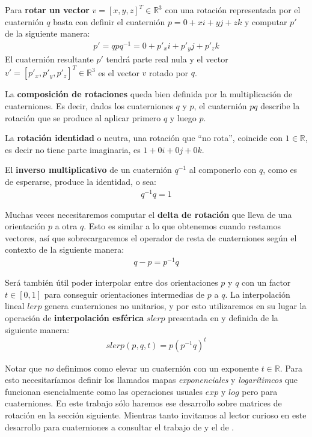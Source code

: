 \documentclass[ twoside,openright,titlepage,numbers=noenddot,%
                headinclude,footinclude,cleardoublepage=empty,abstract=on,
                BCOR=-5mm,paper=a4,fontsize=11pt
                ]{scrreprt}
\newcommand{\R}{\mathbb{R}}
\begin{document}
Para \textbf{rotar un vector} \(v = [x, y, z]^T \in \R^3\) con una
rotación representada por el cuaternión \(q\) basta con definir el
cuaternión \(p = 0 + xi + yj + zk\) y computar \(p'\) de la siguiente
manera: \begin{align}
p' = qpq^{-1} = 0 + p'_x i + p'_y j + p'_z k
\end{align} El cuaternión resultante \(p'\) tendrá parte real nula y el
vector \(v' = [p'_x, p'_y, p'_z]^T \in \R^3\) es el vector \(v\) rotado
por \(q\).

La \textbf{composición de rotaciones} queda bien definida por la
multiplicación de cuaterniones. Es decir, dados los cuaterniones \(q\) y
\(p\), el cuaternión \(pq\) describe la rotación que se produce al
aplicar primero \(q\) y luego \(p\).

La \textbf{rotación identidad} o neutra, una rotación que ``no rota'',
coincide con \(1 \in \R\), es decir no tiene parte imaginaria, es
\(1 + 0i + 0j + 0k\).

El \textbf{inverso multiplicativo} de un cuaternión \(q^{-1}\) al
componerlo con \(q\), como es de esperarse, produce la identidad, o sea:
\begin{align}
q^{-1}q = 1
\end{align}

Muchas veces necesitaremos computar el \textbf{delta de rotación} que
lleva de una orientación \(p\) a otra \(q\). Esto es similar a lo que
obtenemos cuando restamos vectores, así que sobrecargaremos el operador
de resta de cuaterniones según el contexto de la siguiente manera:
\begin{align}
q - p = p^{-1} q
\end{align}

Será también útil poder interpolar entre dos orientaciones \(p\) y \(q\)
con un factor \(t \in [0, 1]\) para conseguir orientaciones intermedias
de \(p\) a \(q\). La interpolación lineal \(lerp\) genera cuaterniones
no unitarios, y por esto utilizaremos en su lugar la operación de
\textbf{interpolación esférica} \(slerp\) presentada en
\textcite{shoemakeAnimatingRotationQuaternion1985} y definida de la
siguiente manera: \begin{align}
slerp(p, q, t) = p(p^{-1}q)^t \label{eq:slerp-def}
\end{align}

Notar que \emph{no} definimos como elevar un cuaternión con un exponente
\(t \in \R\). Para esto necesitaríamos definir los llamados mapas
\emph{exponenciales} y \emph{logarítimcos} que funcionan esencialmente
como las operaciones usuales \(exp\) y \(log\) pero para cuaterniones.
En este trabajo sólo haremos ese desarrollo sobre matrices de rotación
en la sección siguiente. Mientras tanto invitamos al lector curioso en
este desarrollo para cuaterniones a consultar el trabajo de
\textcite{grassiaPracticalParameterizationRotations1998} y el de
\textcite{shoemakeAnimatingRotationQuaternion1985}.
\end{document}
